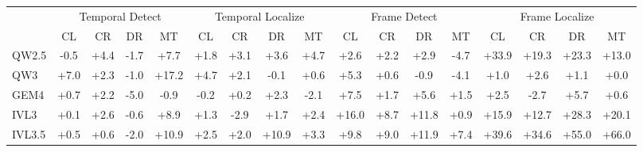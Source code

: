 \documentclass[11pt]{article}
\begin{document}
\begin{table}[t!]
    \centering
    \setlength{\tabcolsep}{4pt}
    \small
    \begin{tabular}{l cccc cccc cccc cccc}
    \toprule
     & \multicolumn{4}{c}{Temporal Detect} & \multicolumn{4}{c}{Temporal Localize} & \multicolumn{4}{c}{Frame Detect} & \multicolumn{4}{c}{Frame Localize} \\
    \cmidrule(lr){2-5} \cmidrule(lr){6-9} \cmidrule(lr){10-13} \cmidrule(lr){14-17}
     & CL & CR & DR & MT & CL & CR & DR & MT & CL & CR & DR & MT & CL & CR & DR & MT \\
    \midrule
    QW2.5 & \cellcolor{red!5}-0.5 & \cellcolor{green!15}+4.4 & \cellcolor{red!10}-1.7 & \cellcolor{green!20}+7.7 & \cellcolor{green!10}+1.8 & \cellcolor{green!13}+3.1 & \cellcolor{green!14}+3.6 & \cellcolor{green!16}+4.7 & \cellcolor{green!12}+2.6 & \cellcolor{green!11}+2.2 & \cellcolor{green!13}+2.9 & \cellcolor{red!16}-4.7 & \cellcolor{green!43}+33.9 & \cellcolor{green!32}+19.3 & \cellcolor{green!36}+23.3 & \cellcolor{green!27}+13.0 \\
    QW3 & \cellcolor{green!20}+7.0 & \cellcolor{green!11}+2.3 & \cellcolor{red!7}-1.0 & \cellcolor{green!31}+17.2 & \cellcolor{green!16}+4.7 & \cellcolor{green!11}+2.1 & \cellcolor{red!2}-0.1 & \cellcolor{green!6}+0.6 & \cellcolor{green!17}+5.3 & \cellcolor{green!6}+0.6 & \cellcolor{red!7}-0.9 & \cellcolor{red!15}-4.1 & \cellcolor{green!7}+1.0 & \cellcolor{green!12}+2.6 & \cellcolor{green!8}+1.1 & +0.0 \\
    GEM4 & \cellcolor{green!6}+0.7 & \cellcolor{green!11}+2.2 & \cellcolor{red!17}-5.0 & \cellcolor{red!7}-0.9 & \cellcolor{red!3}-0.2 & \cellcolor{green!3}+0.2 & \cellcolor{green!11}+2.3 & \cellcolor{red!11}-2.1 & \cellcolor{green!20}+7.5 & \cellcolor{green!10}+1.7 & \cellcolor{green!17}+5.6 & \cellcolor{green!9}+1.5 & \cellcolor{green!12}+2.5 & \cellcolor{red!12}-2.7 & \cellcolor{green!18}+5.7 & \cellcolor{green!6}+0.6 \\
    IVL3 & \cellcolor{green!2}+0.1 & \cellcolor{green!12}+2.6 & \cellcolor{red!6}-0.6 & \cellcolor{green!22}+8.9 & \cellcolor{green!8}+1.3 & \cellcolor{red!13}-2.9 & \cellcolor{green!10}+1.7 & \cellcolor{green!11}+2.4 & \cellcolor{green!30}+16.0 & \cellcolor{green!22}+8.7 & \cellcolor{green!25}+11.8 & \cellcolor{green!7}+0.9 & \cellcolor{green!29}+15.9 & \cellcolor{green!26}+12.7 & \cellcolor{green!39}+28.3 & \cellcolor{green!33}+20.1 \\
    IVL3.5 & \cellcolor{green!5}+0.5 & \cellcolor{green!6}+0.6 & \cellcolor{red!10}-2.0 & \cellcolor{green!24}+10.9 & \cellcolor{green!12}+2.5 & \cellcolor{green!10}+2.0 & \cellcolor{green!24}+10.9 & \cellcolor{green!13}+3.3 & \cellcolor{green!23}+9.8 & \cellcolor{green!22}+9.0 & \cellcolor{green!25}+11.9 & \cellcolor{green!20}+7.4 & \cellcolor{green!46}+39.6 & \cellcolor{green!43}+34.6 & \cellcolor{green!55}+55.0 & \cellcolor{green!60}+66.0 \\

\end{tabular}
\end{table}
\end{document}
